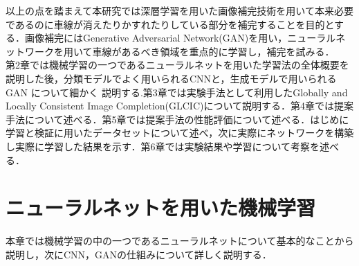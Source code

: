 \documentclass[a4j, 11pt]{jreport}
\begin{document}
\indent 以上の点を踏まえて本研究では深層学習を用いた画像補完技術を用いて本来必要であるのに車線が消えたりかすれたりしている部分を補完することを目的とする．画像補完にはGenerative Adversarial Network(GAN)を用い，ニューラルネットワークを用いて車線があるべき領域を重点的に学習し，補完を試みる．\\
\indent 第2章では機械学習の一つであるニューラルネットを用いた学習法の全体概要を説明した後，分類モデルでよく用いられるCNNと，生成モデルで用いられるGAN について細かく
説明する.第3章では実験手法として利用したGlobally and Locally Consistent Image Completion(GLCIC)について説明する．第4章では提案手法について述べる．第5章では提案手法の性能評価について述べる．はじめに学習と検証に用いたデータセットについて述べ，次に実際にネットワークを構築し実際に学習した結果を示す．第6章では実験結果や学習について考察を述べる．

\chapter{ニューラルネットを用いた機械学習}
本章では機械学習の中の一つであるニューラルネットについて基本的なことから説明し，次にCNN，GANの仕組みについて詳しく説明する．
\end{document}
